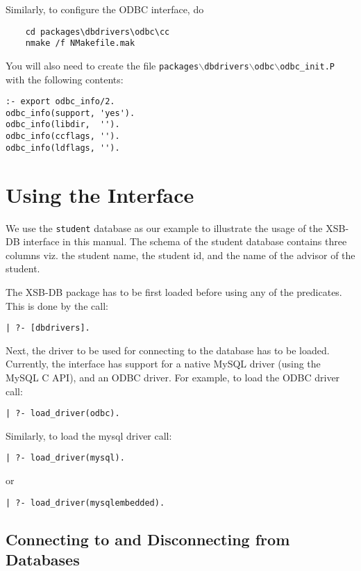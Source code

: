 Similarly, to configure the ODBC interface, do
\begin{verbatim}
    cd packages\dbdrivers\odbc\cc  
    nmake /f NMakefile.mak
\end{verbatim}
You will also need to create the file {\tt packages$\backslash$dbdrivers$\backslash$odbc$\backslash$odbc\_init.P}
with the following contents:
\begin{verbatim}
:- export odbc_info/2.
odbc_info(support, 'yes').
odbc_info(libdir,  '').
odbc_info(ccflags, '').
odbc_info(ldflags, '').
\end{verbatim}


\section{Using the Interface}

We use the {\tt student} database as our example to illustrate 
the usage of the XSB-DB interface in this manual. The schema of the
student database contains three columns viz. the student name, 
the student id, and the name of the advisor of the student.

The XSB-DB package has to be first loaded before using any of the
predicates. This is done by the call:

\begin{verbatim}
| ?- [dbdrivers].
\end{verbatim}

Next, the driver to be used for connecting to the database has to 
be loaded. Currently, the interface has support for a native MySQL driver
(using the MySQL C API), and an ODBC driver. For example, to load 
the ODBC driver call:

\begin{verbatim}
| ?- load_driver(odbc).
\end{verbatim}

Similarly, to load the mysql driver call:

\begin{verbatim}
| ?- load_driver(mysql).
\end{verbatim}
or
\begin{verbatim}
| ?- load_driver(mysqlembedded).
\end{verbatim}

\subsection{Connecting to and Disconnecting from Databases}

